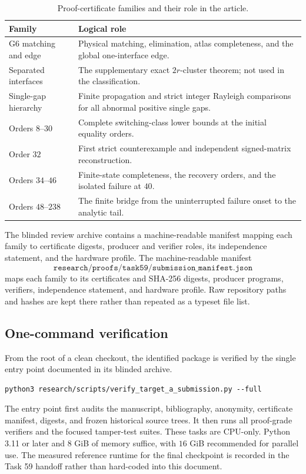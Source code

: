 \begin{table}[ht]
\centering
\small
\begin{tabular}{@{}p{}p{}@{}}
\toprule
Family & Logical role\\
\midrule
G6 matching and edge &
Physical matching, elimination, atlas completeness, and the global
one-interface edge.\\
Separated interfaces &
The supplementary exact \(2r\)-cluster theorem; not used in the
classification.\\
Single-gap hierarchy &
Finite propagation and strict integer Rayleigh comparisons for all abnormal
positive single gaps.\\
Orders \(8\)--\(30\) &
Complete switching-class lower bounds at the initial equality orders.\\
Order \(32\) &
First strict counterexample and independent signed-matrix reconstruction.\\
Orders \(34\)--\(46\) &
Finite-state completeness, the recovery orders, and the isolated failure at
\(40\).\\
Orders \(48\)--\(238\) &
The finite bridge from the uninterrupted failure onset to the analytic tail.\\
\bottomrule
\end{tabular}
\caption{Proof-certificate families and their role in the article.}
\label{tab:certificate-families}
\end{table}

\ifdefined\TargetAAnonymous
The blinded review archive contains a machine-readable manifest mapping each
family to certificate digests, producer and verifier roles, its independence
statement, and the hardware profile.
\else
The machine-readable manifest
\[
\texttt{research/proofs/task59/submission\_manifest.json}
\]
maps each family to its certificates and SHA-256 digests, producer programs,
verifiers, independence statement, and hardware profile. Raw repository
paths and hashes are kept there rather than repeated as a typeset file list.
\fi

\subsection{One-command verification}

From the root of a clean checkout, the identified package is verified by
\ifdefined\TargetAAnonymous
the single entry point documented in its blinded archive.
\else
\begin{verbatim}
python3 research/scripts/verify_target_a_submission.py --full
\end{verbatim}
\fi
The entry point first audits the manuscript, bibliography, anonymity,
certificate manifest, digests, and frozen historical source trees. It then
runs all proof-grade verifiers and the focused tamper-test suites. These
tasks are CPU-only. Python 3.11 or later and \(8\) GiB of memory suffice,
with \(16\) GiB recommended for parallel use. The measured reference runtime
for the final checkpoint is
recorded in the Task 59 handoff rather than hard-coded into this document.

